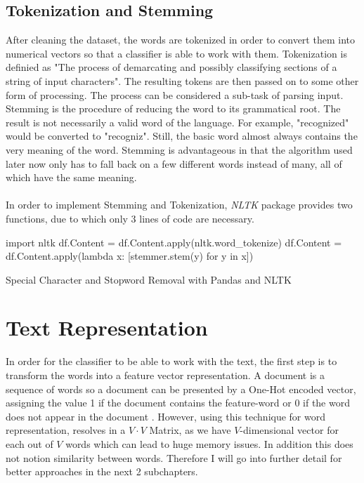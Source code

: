 \documentclass[a4paper, 11pt,titlepage,oneside,openany]{book}
\begin{document}
\subsection{Tokenization and Stemming}
After cleaning the dataset, the words are tokenized in order to convert them into numerical vectors so that a classifier is able to work with them. Tokenization is definied as "The process of demarcating and possibly classifying sections of a string of input characters". The resulting tokens are then passed on to some other form of processing. The process can be considered a sub-task of parsing input.\\
\noindent Stemming is the procedure of reducing the word to its grammatical root. The result is not necessarily a valid word of the language. For example, "recognized" would be converted to "recogniz". Still, the basic word almost always contains the very meaning of the word. Stemming is advantageous in that the algorithm used later now only has to fall back on a few different words instead of many, all of which have the same meaning.\\
\\
\noindent In order to implement Stemming and Tokenization, \textit{NLTK} \cite{nltk} package provides two functions, due to which only 3 lines of code are necessary.\\

\begin{algorithm}[H]
	\DontPrintSemicolon
	import nltk\;
	df.Content = df.Content.apply(nltk.word\_tokenize)\;
	df.Content = df.Content.apply(lambda x: [stemmer.stem(y) for y in x])\;
	\caption{Special Character and Stopword Removal with Pandas and NLTK}
\end{algorithm}

\section{Text Representation}
In order for the classifier to be able to work with the text, the first step is to transform the words into a feature vector representation. A document is a sequence of words \cite{word2vecdortmund} so a document can be presented by a One-Hot encoded vector, assigning the value 1 if the document contains the feature-word or 0 if the word does not appear in the document \cite{textclassification}. However, using this technique for word representation, resolves in a $V \cdot V$ Matrix, as we have $V$-dimensional vector for each out of $V$ words which can lead to huge memory issues. In addition this does not notion similarity between words. Therefore I will go into further detail for better approaches in the next 2 subchapters.
\end{document}
